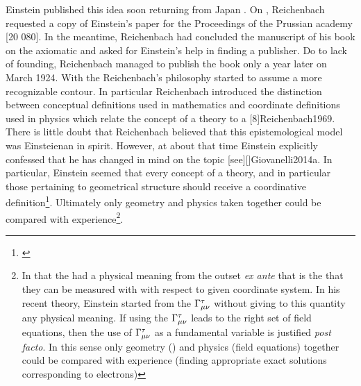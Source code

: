 \documentclass[draft]{article}
\begin{document}
Einstein published this idea soon returning from Japan \citep{Einstein1923c,Einstein1923e}. On , Reichenbach requested a copy of Einstein's paper for the Proceedings of the Prussian academy [20 080]. In the meantime, Reichenbach had concluded the manuscript of his book on the axiomatic and asked for Einstein's help in finding a publisher. Do to lack of founding, Reichenbach managed to publish the book only a year later on March 1924. With the  \citet{Reichenbach1924} Reichenbach's philosophy started to assume a more recognizable contour. In particular Reichenbach introduced the distinction between conceptual definitions used in mathematics and coordinate definitions used in physics which relate the concept of a theory to a  [8]{Reichenbach1969}. There is little doubt that Reichenbach believed that this epistemological model was Einsteienan in spirit. However, at about that time Einstein explicitly confessed that he has changed in mind on the topic [see][]{Giovanelli2014a}. In particular, Einstein seemed that every concept of a theory, and in particular those pertaining to geometrical structure should receive a coordinative definition\footnote{ \citep[1691]{Einstein1924}}. Ultimately only geometry and physics taken together could be compared with experience\footnote{In \gr that the \gmn had a physical meaning from the outset \emph{ex ante} that is the \rac that they can be measured with \rac with respect to given coordinate system. In his recent theory, Einstein started from the $\Gamma^\tau_{\mu\nu}$ without giving to this quantity any physical meaning. If using the $\Gamma^\tau_{\mu\nu}$ leads to the right set of field equations, then the use of $\Gamma^\tau_{\mu\nu}$ as a fundamental variable is justified \emph{post facto}. In this sense only geometry (\gmn \Gtmn\etc) and physics (field equations) together could be compared with experience (finding appropriate exact solutions corresponding to electrons)}.
\end{document}
